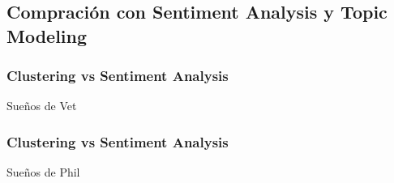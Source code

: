 \documentclass{beamer}
\begin{document}
\subsection{Compración con Sentiment Analysis y Topic Modeling}
\begin{frame}
\frametitle{Clustering vs Sentiment Analysis}
Sueños de Vet
\end{frame}


\begin{frame}
\frametitle{Clustering vs Sentiment Analysis}
Sueños de Phil
\end{frame}
\end{document}
